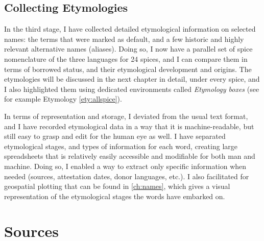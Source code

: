
\subsection{Collecting Etymologies}
\label{sec:collecting_etymologies}

In the third stage, I have collected detailed etymological information on selected names: the terms that were marked as default, and a few historic and highly relevant alternative names (aliases). Doing so, I now have a parallel set of spice nomenclature of the three languages for 24 spices, and I can compare them in terms of borrowed status, and their etymological development and origins. The etymologies will be discussed in the next chapter in detail, under every spice, and I also highlighted them using dedicated environments called \textit{Etymology boxes} (see for example Etymology \ref{ety:allspice}).

In terms of representation and storage, I deviated from the usual text format, and I have recorded etymological data in a way that it is machine-readable, but still easy to grasp and edit for the human eye as well. I have separated etymological stages, and types of information for each word, creating large spreadsheets that is relatively easily accessible and modifiable for both man and machine. Doing so, I enabled a way to extract only specific information when needed (sources, attestation dates, donor languages, etc.). I also facilitated for geospatial plotting that can be found in \cref{ch:names}, which gives a visual representation of the etymological stages the words have embarked on.







\section{Sources}

